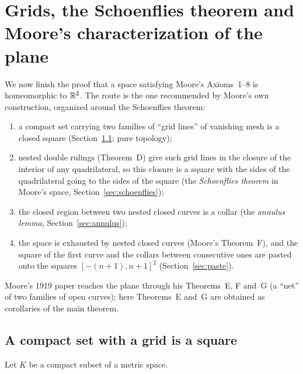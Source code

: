 \chapter{Grids, the Schoenflies theorem and Moore's characterization of the plane}\label{ch:plane}

We now finish the proof that a space satisfying Moore's Axioms~1--8 is homeomorphic to $\mathbb{R}^2$. The route is
the one recommended by Moore's own construction, organized around the Schoenflies theorem:
\begin{enumerate}
\item a compact set carrying two families of ``grid lines'' of vanishing mesh is a closed square
(Section~\ref{sec:grid}; pure topology);
\item nested double rulings (Theorem~D) give such grid lines in the closure of the interior of any quadrilateral, so
this closure is a square with the sides of the quadrilateral going to the sides of the square (the
\emph{Schoenflies theorem} in Moore's space, Section~\ref{sec:schoenflies});
\item the closed region between two nested closed curves is a collar (the \emph{annulus lemma},
Section~\ref{sec:annulus});
\item the space is exhausted by nested closed curves (Moore's Theorem~F), and the square of the first curve and the
collars between consecutive ones are pasted onto the squares $[-(n+1),n+1]^2$ (Section~\ref{sec:paste}).
\end{enumerate}
Moore's 1919 paper reaches the plane through his Theorems~E, F and~G (a ``net'' of two families of open curves);
here Theorems~E and~G are obtained as corollaries of the main theorem.

\section{A compact set with a grid is a square}\label{sec:grid}

Let $K$ be a compact subset of a metric space.

